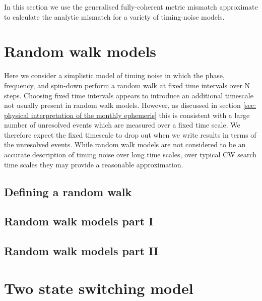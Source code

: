 \documentclass[../full_thesis/full_thesis.tex]{subfiles}
\newcommand{\thisdir}{../analytic_timing_noise_cgw}
\begin{document}
In this section we use the generalised fully-coherent metric mismatch approximate
to calculate the analytic mismatch for a variety of timing-noise models.

\section{Random walk models}
\label{sec: random walk models}

Here  we consider a simplistic model of timing noise in which the phase,
frequency, and spin-down perform a random walk at fixed time intervals over N
steps. Choosing fixed time intervals appears to introduce an additional
timescale not usually present in random walk models. However, as discussed in
section \ref{sec: physical interpretation of the monthly ephemeris} this is
consistent with a large number of unresolved events which are measured over a
fixed time scale. We therefore expect the fixed timescale to drop out when we
write results in terms of the unresolved events.  While random walk models are
not considered to be an accurate description of timing noise over long time
scales, over typical CW search time scales they may provide a reasonable
approximation.

\subsection{Defining a random walk}
\label{sec: Defining a random walk}


\subsection{Random walk models part I}
\label{sec: Random walk models part I}


\subsection{Random walk models part II} 
\label{sec: Random walk models part II}


\section{Two state switching model}
\label{sec: Two state switching model}



\begin{subappendices}
    
\end{subappendices}


\biblio
\end{document}
